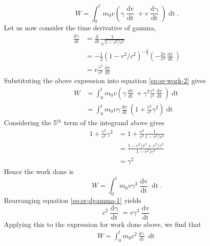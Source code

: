\begin{equation}
    W = \int_0^t m_0 v \left(\gamma \frac{\mathop{\mathrm{d}v}}{\mathop{\mathrm{d}t}} + v \frac{\mathop{\mathrm{d}\gamma}}{\mathop{\mathrm{d}t}}\right) \mathop{\mathrm{d}t}.
    \label{eq:sr-work-2}
\end{equation}
Let us now consider the time derivative of gamma, 
\begin{align}
    \frac{\mathop{\mathrm{d}\gamma}}{\mathop{\mathrm{d}t}} &= \frac{\mathrm{d}}{\mathop{\mathrm{d}t}} \frac{1}{\sqrt{1 - v^2/c^2}} \\
    &= - \frac{1}{2} (1 - v^2 / c^2)^{-\frac{3}{2}} \left(-\frac{2v}{c^2} \frac{\mathop{\mathrm{d}v}}{\mathop{\mathrm{d}t}}\right) \\
    &= v \frac{\gamma^3 }{c^2} \frac{\mathop{\mathrm{d}v}}{\mathop{\mathrm{d}t}} \label{eq:sr-dgamma-1}
\end{align}
Substituting the above expression into equation \ref{eq:sr-work-2} gives
\begin{align}
    W &= \int_0^t m_0 v \left(\gamma \frac{\mathop{\mathrm{d}v}}{\mathop{\mathrm{d}t}} + \gamma^3 \frac{v^2}{c^2} \frac{\mathop{\mathrm{d}v}}{\mathop{\mathrm{d}t}}\right) \mathop{\mathrm{d}t} \\
    &= \int_0^t m_0 v \gamma \frac{\mathop{\mathrm{d}v}}{\mathop{\mathrm{d}t}} \left(1 + \frac{v^2}{c^2} \gamma^2\right) \mathop{\mathrm{d}t}
\end{align}
Considering the 5$^{th}$ term of the integrand above gives
\begin{align}
    1 + \frac{v^2}{c^2} \gamma^2 &= 1 + \frac{v^2}{c^2} \frac{1}{1-v^2/c^2} \\
    &= \frac{1-v^2/c^2+v^2/c^2}{1-v^2/c^2} \\ 
    &= \gamma^2
\end{align}
Hence the work done is 
\begin{equation}
    W = \int_0^t m_0 v \gamma^3 \frac{\mathop{\mathrm{d}v}}{\mathop{\mathrm{d}t}} \mathop{\mathrm{d}t}. 
\end{equation}
Rearranging equation \ref{eq:sr-dgamma-1} yields
\begin{equation}
    c^2 \frac{\mathop{\mathrm{d}\gamma}}{\mathop{\mathrm{d}t}} = v \gamma^3 \frac{\mathop{\mathrm{d}v}}{\mathop{\mathrm{d}t}}
\end{equation}
Applying this to the expression for work done above, we find that 
\begin{align}
    W = \int_0^t m_0 c^2 \frac{\mathop{\mathrm{d}\gamma}}{\mathop{\mathrm{d}t}} \mathop{\mathrm{d}t} 
\end{align}
